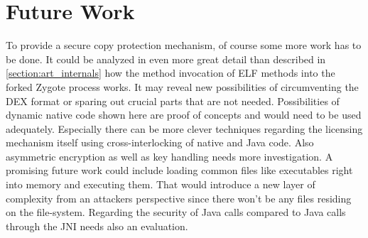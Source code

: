 \section{Future Work}\label{section:future_work}
To provide a secure copy protection mechanism, of course some more work has to
be done. It could be analyzed in even more great detail than described in \autoref{section:art_internals} how the method invocation of ELF methods into
the forked Zygote process works. It may reveal new possibilities of circumventing
the DEX format or sparing out crucial parts that are not needed. Possibilities
of dynamic native code shown here are proof of concepts and would need to be
used adequately. Especially there can be more clever techniques regarding 
the licensing mechanism itself using cross-interlocking of native and Java code.
Also asymmetric encryption as well as key handling needs more investigation.
A promising future work could include loading common files
like executables right into memory and executing them. That would introduce 
a new layer of complexity from an attackers perspective since there won't be
any files residing on the file-system. Regarding the security of Java calls 
compared to Java calls through the JNI needs also an evaluation. 

